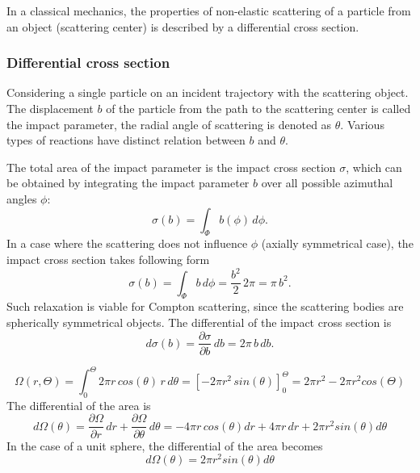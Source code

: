 \documentclass[a4paper,12pt,titlepage, twoside]{article}
\begin{document}

In a classical mechanics, the properties of non-elastic scattering of a particle from an object (scattering center) is described by a differential cross section.

\subsubsection{Differential cross section}

Considering a single particle on an incident trajectory with the scattering object.
The displacement $b$ of the particle from the path to the scattering center is called the impact parameter, the radial angle of scattering is denoted as $\theta$.
Various types of reactions have distinct relation between $b$ and $\theta$.

The total area of the impact parameter is the impact cross section $\sigma$, which can be obtained by integrating the impact parameter $b$ over all possible azimuthal angles $\phi$:
\begin{equation}
  \sigma\left(b\right) = \int_\Phi b\left(\phi\right)\,d\phi.
\end{equation}
In a case where the scattering does not influence $\phi$ (axially symmetrical case), the impact cross section takes following form
\begin{equation}
  \sigma\left(b\right) = \int_\Phi b\,d\phi = \frac{b^{2}}{2}\,2\pi = \pi\,b^2.
\end{equation}
Such relaxation is viable for Compton scattering, since the scattering bodies are spherically symmetrical objects.
The differential of the impact cross section is
\begin{equation}
  d\sigma\left(b\right) = \frac{\partial \sigma}{\partial b}\,db = 2\pi\,b\,db.
\end{equation}

\begin{equation}
  \Omega\left(r, \Theta\right) = \int_0^\Theta 2\pi r\,cos\left(\theta\right)\,r\,d\theta = \left[-2\pi r^2\,sin\left(\theta\right)\right]_0^\Theta = 2\pi r^2 - 2\pi r^2cos\left(\Theta\right)
\end{equation}
The differential of the area is
\begin{equation}
  d\Omega\left(\theta\right) = \frac{\partial \Omega}{\partial r}\,dr + \frac{\partial \Omega}{\partial \theta}\,d\theta = -4\pi r\,cos\left(\theta\right)dr + 4\pi r\,dr + 2\pi r^2sin\left(\theta\right)d\theta
\end{equation}
In the case of a unit sphere, the differential of the area becomes
\begin{equation}
  d\Omega(\theta) = 2\pi r^2sin\left(\theta\right)d\theta
\end{equation}
\end{document}
